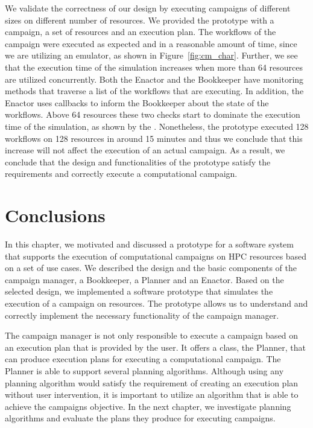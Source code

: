 We validate the correctness of our design by executing campaigns of different sizes on different number of resources.
We provided the prototype with a campaign, a set of resources and an execution plan.
The workflows of the campaign were executed as expected and in a reasonable amount of time, since we are utilizing an emulator, as shown in Figure~\ref{fig:cm_char}.
Further, we see that the execution time of the simulation increases when more than 64 resources are utilized concurrently.
Both the Enactor and the Bookkeeper have monitoring methods that traverse a list of the workflows that are executing.
In addition, the Enactor uses callbacks to inform the Bookkeeper about the state of the workflows.
Above 64 resources these two checks start to dominate the execution time of the simulation, as shown by the .
Nonetheless, the prototype executed 128 workflows on 128 resources in around 15 minutes and thus we conclude that this increase will not affect the execution of an actual campaign.
As a result, we conclude that the design and functionalities of the prototype satisfy the requirements and correctly execute a computational campaign.


\section{Conclusions}
\label{sec:cm_concl}
In this chapter, we motivated and discussed a prototype for a software system that supports the execution of computational campaigns on HPC resources based on a set of use cases.
We described the design and the basic components of the campaign manager, a Bookkeeper, a Planner and an Enactor.
Based on the selected design, we implemented a software prototype that simulates the execution of a campaign on resources.
The prototype allows us to understand and correctly implement the necessary functionality of the campaign manager.

The campaign manager is not only responsible to execute a campaign based on an execution plan that is provided by the user.
It offers a class, the Planner, that can produce execution plans for executing a computational campaign.
The Planner is able to support several planning algorithms.
Although using any planning algorithm would satisfy the requirement of creating an execution plan without user intervention, it is important to utilize an algorithm that is able to achieve the campaigns objective.
In the next chapter, we investigate planning algorithms and evaluate the plans they produce for executing campaigns.

